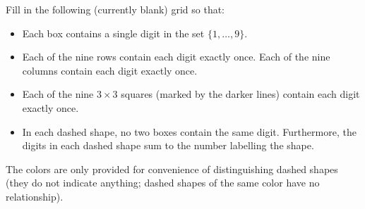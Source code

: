 Fill in the following (currently blank) grid so that:
	\begin{itemize}
		\item Each box contains a single digit in the set $\{1,\dots,9\}$.
		\item Each of the nine rows contain each digit exactly once. Each of the nine columns contain each digit exactly once.
		\item Each of the nine $3\times3$ squares (marked by the darker lines) contain each digit exactly once.
		\item In each dashed shape, no two boxes contain the same digit. Furthermore, the digits in each dashed shape sum to the number labelling the shape.
	\end{itemize}
	The colors are only provided for convenience of distinguishing dashed shapes (they do not indicate anything; dashed shapes of the same color have no relationship).
